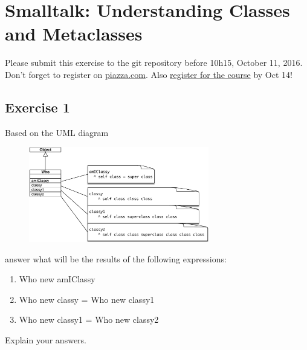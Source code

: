\documentclass [11pt, a4wide, twoside]{article}
\begin{document}
\section*{Smalltalk: Understanding Classes and Metaclasses}


Please submit this exercise to the git repository before 10h15, October 11, 2016.
Don't forget to register on \href{https://piazza.com/unibe.ch/fall2016/sma21045}{piazza.com}.
Also \href{https://www-academia.unine.ch/imoniteur_pbol/PORTAL3S.htm}{register for the course} by Oct 14!

\subsection*{Exercise 1}
Based on the UML diagram

\begin{figure}[h]
\centering
\includegraphics[width=0.7\textwidth]{super.pdf}
\end{figure}
\noindent

answer what will be the results of the following expressions:
\begin{enumerate}
\item \begin{code}
	Who new amIClassy
	\end{code}
	
\item \begin{code}
	Who new classy = Who new classy1
	\end{code}
	
\item \begin{code}
	Who new classy1 = Who new classy2
	\end{code}

\end{enumerate}
Explain your answers.
\end{document}
